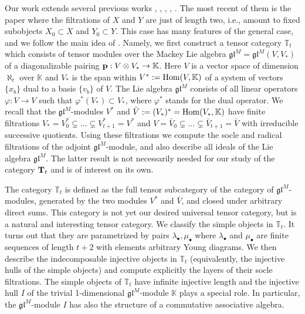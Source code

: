 \documentclass[12pt]{article}
\def\KK {{\mathbb K}}     %
\def\TT {{\mathbb T}}     %
\def\mk {\mathfrak}
\begin{document}
Our work extends several previous works \cite{Penkov-Serganova-Mackey}, \cite{Sam-Snowden}, \cite{Chirvasitu-Penkov-OTC}, \cite{Chirvasitu-Penkov-RC}, \cite{Chirvasitu-Penkov-UTC}. The most recent of them is the paper \cite{Chirvasitu-Penkov-UTC} where the filtrations of $X$ and $Y$ are just of length two, i.e., amount to fixed subobjects $X_0\subset X$ and $Y_0\subset Y$. This case has many features of the general case, and we follow the main idea of \cite{Chirvasitu-Penkov-UTC}. Namely, we first construct a tensor category $\TT_{t}$ which consists of tensor modules over the Mackey Lie algebra $\mk{gl}^M=\mk{gl}^M(V,V_*)$ of a diagonalizable pairing ${\bf p}:V\otimes V_*\to\KK$. Here $V$ is a vector space of dimension $\aleph_{t}$ over $\KK$ and $V_*$ is the span within $V^*:={\rm Hom}(V,\KK)$ of a system of vectors $\{x_b\}$ dual to a basis $\{v_b\}$ of $V$. The Lie algebra $\mk{gl}^M$ consists of all linear operators $\varphi:V\to V$ such that $\varphi^*(V_*)\subset V_*$, where $\varphi^*$ stands for the dual operator. We recall that the $\mk{gl}^M$-modules $V^*$ and $\bar V:=(V_*)^*={\rm Hom}(V_*,\KK)$ have finite filtrations $V_*=V^*_{0}\subsetneq ... \subsetneq V^*_{t+1} = V^*$ and $V=\bar V_{0}\subsetneq ... \subsetneq \bar V_{t+1}=\bar V$ with irreducible successive quotients. Using these filtrations we compute the socle and radical filtrations of the adjoint $\mk{gl}^M$-module, and also describe all ideals of the Lie algebra $\mk{gl}^M$. The latter result is not necessarily needed for our study of the category ${\bf T}_{t}$ and is of interest on its own.

The category $\TT_{t}$ is defined as the full tensor subcategory of the category of $\mk{gl}^M$-modules, generated by the two modules $V^*$ and $\bar V$, and closed under arbitrary direct sums. This category is not yet our desired universal tensor category, but is a natural and interesting tensor category. We classify the simple objects in $\TT_{t}$. It turns out that they are parametrized by pairs $\lambda_\bullet,\mu_\bullet$ where $\lambda_\bullet$ and $\mu_\bullet$ are finite sequences of length $t+2$ with elements arbitrary Young diagrams. We then describe the indecomposable injective objects in $\TT_{t}$ (equivalently, the injective hulls of the simple objects) and compute explicitly the layers of their socle filtrations. The simple objects of $\TT_{t}$ have infinite injective length and the injective hull $I$ of the trivial 1-dimensional $\mk{gl}^M$-module $\KK$ plays a special role. In particular, the $\mk{gl}^M$-module $I$ has also the structure of a commutative associative algebra.
\end{document}
